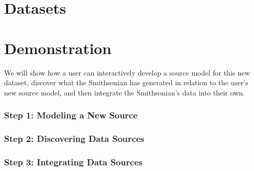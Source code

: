 \documentclass[runningheads,a4paper]{llncs}
\begin{document}
\section{Datasets}


\section{Demonstration}

We will show how a user can interactively develop a source model for this new dataset, discover what the Smithsonian has generated in relation to the user's new source model, and then integrate the Smithsonian's data into their own.  

\subsubsection{Step 1: Modeling a New Source} 


\subsubsection{Step 2: Discovering Data Sources} 


\subsubsection{Step 3: Integrating Data Sources} 




\end{document}
